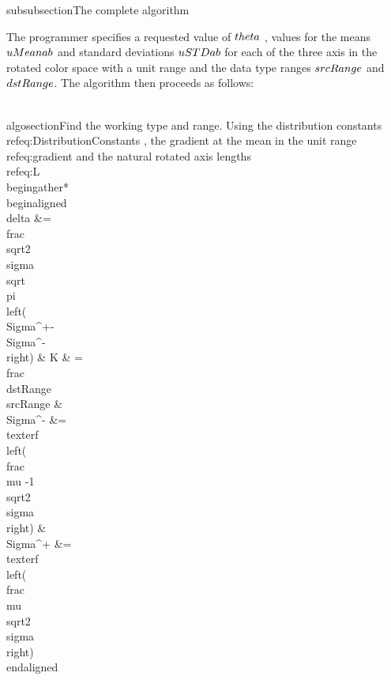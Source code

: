 subsubsection{The complete algorithm}


The programmer specifies a requested value of $\\theta$ , values for the means $\\uMean{ ab}$ and standard deviations $\\uSTD{ ab}$ for each of the three axis in the rotated color space with a unit range and the data type ranges $\\srcRange$ and $\\dstRange$. The algorithm then proceeds as follows:

\\algosection{Find the working type and range.} 
Using the distribution constants \\ref{eq:DistributionConstants} , the gradient at the mean in the unit range \\ref{eq:gradient} and the natural rotated axis lengths \\ref{eq:L}
\\begin{gather*}
 \\begin{aligned}
  \\delta  &= \\frac{ \\sqrt{2} }{ \\sigma \\sqrt{\\pi }  \\left(\\Sigma^+-\\Sigma^-\\right)} & 
 K & =  \\frac{\\dstRange}{\\srcRange}  & 
 \\Sigma^- &= \\text{erf}\\left(\\frac{\\mu -1}{\\sqrt{2} \\sigma }\\right) &
 \\Sigma^+ &= \\text{erf}\\left(\\frac{\\mu }{\\sqrt{2} \\sigma }\\right) 
  \\end{aligned} \\\\
